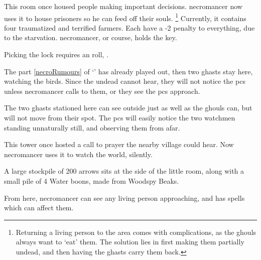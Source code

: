 
This room once housed people making important decisions.
\Gls{necromancer} now uses it to house prisoners so he can feed off their souls.%
\footnote{Returning a living person to the area comes with complications, as the ghouls always want to `eat' them.
  The solution lies in first making them partially undead, and then having the ghasts carry them back.}
  Currently, it contains four traumatized and terrified farmers.
  Each have a -2 penalty to everything, due to the starvation.
  \Gls{necromancer}, or course, holds the key.

  Picking the lock requires an  roll, \tn[7].



The part \ref{necroRumours} of `' has already played out, then two ghasts stay here, watching the birds.
Since the undead cannot hear, they will not notice the \glspl{pc} unless \gls{necromancer} calls to them, or they see the \glspl{pc} approach.


The two ghasts stationed here can see outside just as well as the ghouls can, but will not move from their spot.
The \glspl{pc} will easily notice the two watchmen standing unnaturally still, and observing them from afar.


\begin{exampletext}
This tower once hosted a call to prayer the nearby \gls{village} could hear.
Now \gls{necromancer} uses it to watch the world, silently.
\end{exampletext}

A large stockpile of 200 arrows sits at the side of the little room, along with a small pile of 4 Water \glspl{boon}, made from Woodspy Beaks.

From here, \gls{necromancer} can see any living person approaching, and has spells which can affect them.

\thenecromancer

\showStdSpells[
  \deathStormSpell
]

